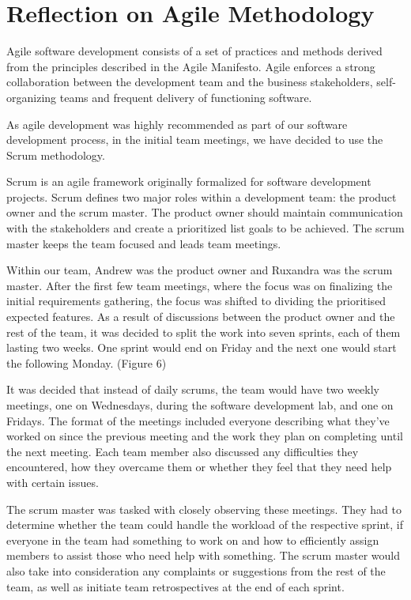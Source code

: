 \documentclass{l3proj}
\begin{document}
\newpage
\section{Reflection on Agile Methodology}
\label{sec:agile}


Agile software development consists of a set of practices and methods derived from the principles described in the Agile Manifesto. Agile enforces a strong collaboration between the development team and the business stakeholders, self-organizing teams and frequent delivery of functioning software.\cite{agile_overview}

As agile development was highly recommended as part of our software development process, in the initial team meetings, we have decided to use the Scrum methodology.

 Scrum is an agile framework originally formalized for software development projects. Scrum defines two major roles within a development team: the product owner and the scrum master. The product owner should maintain communication with the stakeholders and create a prioritized list goals to be achieved. The scrum master keeps the team focused and leads team meetings.\cite{scrum_overview}

 Within our team, Andrew was the product owner and Ruxandra was the scrum master. After the first few team meetings, where the focus was on finalizing the initial requirements gathering, the focus was shifted to dividing the prioritised expected features. As a result of discussions between the product owner and the rest of the team, it was decided to split the work into seven sprints, each of them lasting two weeks. One sprint would end on Friday and the next one would start the following Monday. (Figure 6)


 It was decided that instead of daily scrums, the team would have two weekly meetings, one on Wednesdays, during the software development lab, and one on Fridays. The format of the meetings included everyone describing what they've worked on since the previous meeting and the work they plan on completing until the next meeting. Each team member also discussed any difficulties they encountered, how they overcame them or whether they feel that they need help with certain issues.

 The scrum master was tasked with closely observing these meetings. They had to determine whether the team could handle the workload of the respective sprint, if everyone in the team had something to work on and how to efficiently assign members to assist those who need help with something. The scrum master would also take into consideration any complaints or suggestions from the rest of the team, as well as initiate team retrospectives at the end of each sprint.
\end{document}
